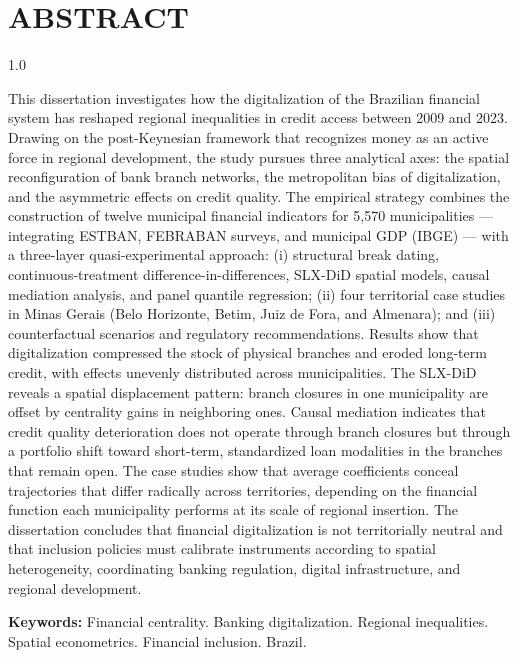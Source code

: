\section*{ABSTRACT}

\begin{spacing}{1.0}
\justify

\setlength{\parindent}{0pt}

This dissertation investigates how the digitalization of the Brazilian financial system has reshaped regional inequalities in credit access between 2009 and 2023. Drawing on the post-Keynesian framework that recognizes money as an active force in regional development, the study pursues three analytical axes: the spatial reconfiguration of bank branch networks, the metropolitan bias of digitalization, and the asymmetric effects on credit quality. The empirical strategy combines the construction of twelve municipal financial indicators for 5,570 municipalities --- integrating ESTBAN, FEBRABAN surveys, and municipal GDP (IBGE) --- with a three-layer quasi-experimental approach: (i) structural break dating, continuous-treatment difference-in-differences, SLX-DiD spatial models, causal mediation analysis, and panel quantile regression; (ii) four territorial case studies in Minas Gerais (Belo Horizonte, Betim, Juiz de Fora, and Almenara); and (iii) counterfactual scenarios and regulatory recommendations. Results show that digitalization compressed the stock of physical branches and eroded long-term credit, with effects unevenly distributed across municipalities. The SLX-DiD reveals a spatial displacement pattern: branch closures in one municipality are offset by centrality gains in neighboring ones. Causal mediation indicates that credit quality deterioration does not operate through branch closures but through a portfolio shift toward short-term, standardized loan modalities in the branches that remain open. The case studies show that average coefficients conceal trajectories that differ radically across territories, depending on the financial function each municipality performs at its scale of regional insertion. The dissertation concludes that financial digitalization is not territorially neutral and that inclusion policies must calibrate instruments according to spatial heterogeneity, coordinating banking regulation, digital infrastructure, and regional development.

\vspace{1em}
\textbf{Keywords:} Financial centrality. Banking digitalization. Regional inequalities. Spatial econometrics. Financial inclusion. Brazil.

\setlength{\parindent}{15pt}

\end{spacing}

